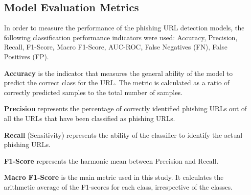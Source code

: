\documentclass[conference]{IEEEtran}
\begin{document}


\subsection{Model Evaluation Metrics}
In order to measure the performance of the phishing URL detection models, the following classification performance indicators were used: Accuracy, Precision, Recall, F1-Score, Macro F1-Score, AUC-ROC, False Negatives (FN), False Positives (FP). 

\textbf{Accuracy}  is the indicator that measures the general ability of the model to predict the correct class for the URL. The metric is calculated as a ratio of correctly predicted samples to the total number of samples.


\textbf{Precision} represents the percentage of correctly identified phishing URLs out of all the URLs that have been classified as phishing URLs.

\textbf{Recall} (Sensitivity) represents the ability of the classifier to identify the actual phishing URLs.

\textbf{F1-Score} represents the harmonic mean between Precision and Recall.

\textbf{Macro F1-Score}  is the main metric used in this study. It calculates the arithmetic average of the F1-scores for each class, irrespective of the classes.
\end{document}
